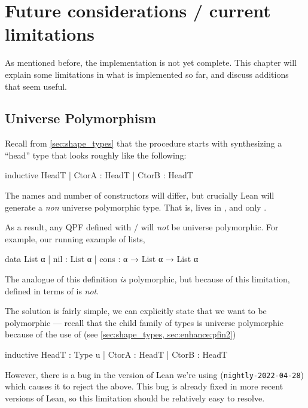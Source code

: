 
\chapter{Future considerations / current limitations}
\label{ch:limitations}


As mentioned before, the implementation is not yet complete.
This chapter will explain some limitations in what is implemented so far, and discuss
additions that seem useful.

\section{Universe Polymorphism}

Recall from \ref{sec:shape_types} that the procedure starts with synthesizing a ``head'' type that
looks roughly like the following:
\begin{leancode}
  inductive HeadT
    | CtorA : HeadT
    | CtorB : HeadT
\end{leancode}
The names and number of constructors will differ, but crucially Lean will generate a \emph{non} universe 
polymorphic type. That is,  lives in , and only .

As a result, any QPF defined with \data{}/\codata{} will \emph{not} be universe polymorphic.
For example, our running example of lists,
\begin{leancode}
  data List α 
    | nil  : List α
    | cons : α → List α → List α
\end{leancode}

The \inductive{} analogue of this definition \emph{is} polymorphic, but because of this limitation,
 defined in terms of \data{} is \emph{not}.
  

The solution is fairly simple, we can explicitly state that we want  to be polymorphic
--- recall that the child family of types is universe polymorphic because of the use of  (see \ref{sec:shape_types, sec:enhance:pfin2})
\begin{badleancode}

  inductive HeadT : Type u
    | CtorA : HeadT
    | CtorB : HeadT

\end{badleancode}

However, there is a bug in the version of Lean we're using (\texttt{nightly-2022-04-28}) 
which causes it to reject the above. 
This bug is already fixed in more recent versions of Lean, 
so this limitation should be relatively easy to resolve.




